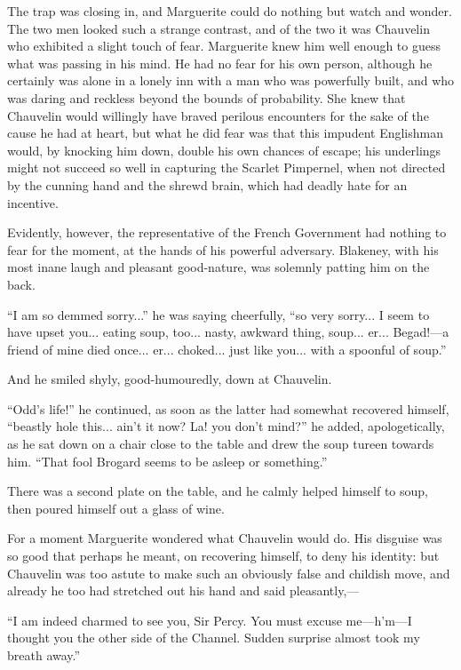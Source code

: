 \documentclass[paper=a5,BCOR=7mm,twoside,DIV=calc,12pt,usegeometry,chapterprefix,endperiod,headings=big]{scrbook}
\begin{document}
The trap was closing in, and Marguerite could do nothing but watch and wonder. The two men looked such a strange contrast, and of the two it was Chauvelin who exhibited a slight touch of fear. Marguerite knew him well enough to guess what was passing in his mind. He had no fear for his own person, although he certainly was alone in a lonely inn with a man who was powerfully built, and who was daring and reckless beyond the bounds of probability. She knew that Chauvelin would willingly have braved perilous encounters for the sake of the cause he had at heart, but what he did fear was that this impudent Englishman would, by knocking him down, double his own chances of escape; his underlings might not succeed so well in capturing the Scarlet Pimpernel, when not directed by the cunning hand and the shrewd brain, which had deadly hate for an incentive.

Evidently, however, the representative of the French Government had nothing to fear for the moment, at the hands of his powerful adversary. Blakeney, with his most inane laugh and pleasant good-nature, was solemnly patting him on the back.

\enquote{I am so demmed sorry...} he was saying cheerfully, \enquote{so very sorry... I seem to have upset you... eating soup, too... nasty, awkward thing, soup... er... Begad!---a friend of mine died once... er... choked... just like you... with a spoonful of soup.}

And he smiled shyly, good-humouredly, down at Chauvelin.

\enquote{Odd's life!} he continued, as soon as the latter had somewhat recovered himself, \enquote{beastly hole this... ain't it now? La! you don't mind?} he added, apologetically, as he sat down on a chair close to the table and drew the soup tureen towards him. \enquote{That fool Brogard seems to be asleep or something.}

There was a second plate on the table, and he calmly helped himself to soup, then poured himself out a glass of wine.

For a moment Marguerite wondered what Chauvelin would do. His disguise was so good that perhaps he meant, on recovering himself, to deny his identity: but Chauvelin was too astute to make such an obviously false and childish move, and already he too had stretched out his hand and said pleasantly,---

\enquote{I am indeed charmed to see you, Sir Percy. You must excuse me---h'm---I thought you the other side of the Channel. Sudden surprise almost took my breath away.}
\end{document}
